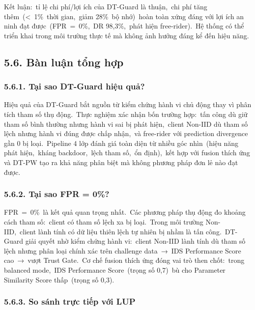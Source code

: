 Kết luận:~tỉ lệ chi phí/lợi ích của DT-Guard là thuận,~chi phí tăng thêm~(\textless~1\%~thời gian,~giảm 28\%~bộ nhớ)~hoàn toàn xứng đáng với lợi ích an ninh đạt được~(FPR~=~0\%,~DR 98,3\%,~phát hiện free-rider).~Hệ thống có thể triển khai trong môi trường thực tế mà không ảnh hưởng đáng kể đến hiệu năng.

\subsection{5.6. Bàn luận tổng hợp}\label{buxe0n-luux1eadn-tux1ed5ng-hux1ee3p}

\subsubsection{5.6.1. Tại sao DT-Guard hiệu quả?}\label{tux1ea1i-sao-dt-guard-hiux1ec7u-quux1ea3}

Hiệu quả của DT-Guard bắt nguồn từ kiểm chứng hành vi chủ động thay vì phân tích tham số thụ động.~Thực nghiệm xác nhận bốn trường hợp:~tấn công dù giữ tham số bình thường nhưng hành vi sai bị phát hiện,~client Non-IID dù tham số lệch nhưng hành vi đúng được chấp nhận,~và free-rider với prediction divergence gần 0 bị loại.~Pipeline 4 lớp đánh giá toàn diện từ nhiều góc nhìn~(hiệu năng phát hiện,~kháng backdoor,~lệch tham số,~ổn định),~kết hợp với fusion thích ứng và DT-PW tạo ra khả năng phân biệt mà không phương pháp đơn lẻ nào đạt được.

\subsubsection{5.6.2. Tại sao FPR = 0\%?}\label{tux1ea1i-sao-fpr-0}

FPR~=~0\%~là kết quả quan trọng nhất.~Các phương pháp thụ động đo khoảng cách tham số:~client có tham số lệch xa bị loại.~Trong môi trường Non-IID,~client lành tính có dữ liệu thiên lệch tự nhiên bị nhầm là tấn công.~DT-Guard giải quyết nhờ kiểm chứng hành vi:~client Non-IID lành tính dù tham số lệch nhưng phân loại chính xác trên challenge data~→~IDS Performance Score cao~→~vượt Trust Gate.~Cơ chế fusion thích ứng đóng vai trò then chốt:~trong balanced mode,~IDS Performance Score~(trọng số 0,7)~bù cho Parameter Similarity Score thấp~(trọng số 0,3).

\subsubsection{5.6.3. So sánh trực tiếp với LUP}\label{so-suxe1nh-trux1ef1c-tiux1ebfp-vux1edbi-lup}


